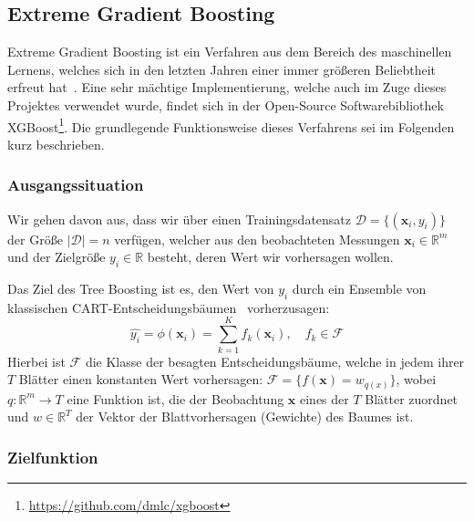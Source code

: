 \subsection{Extreme Gradient Boosting}
\label{sec:xgboost}

Extreme Gradient Boosting ist ein Verfahren aus dem Bereich des maschinellen Lernens, welches sich
in den letzten Jahren einer immer gr\"o{\ss}eren Beliebtheit erfreut hat~\cite{XGBoost}.
Eine sehr m\"achtige Implementierung, welche auch im Zuge dieses Projektes verwendet wurde, 
findet sich in der Open-Source Softwarebibliothek XGBoost\footnote{\url{https://github.com/dmlc/xgboost}}.
Die grundlegende Funktionsweise dieses Verfahrens sei im Folgenden kurz beschrieben.

\subsubsection{Ausgangssituation}

Wir gehen davon aus, dass wir \"uber einen Trainingsdatensatz $\mathcal{D} = \{(\mathbf{x}_i, y_i)\}$
der Gr\"o{\ss}e $\left| \mathcal{D} \right| = n$ verf\"ugen, welcher aus den beobachteten Messungen $\mathbf{x}_i \in \mathbb{R}^m$
und der Zielgr\"o{\ss}e $y_i \in \mathbb{R}$ besteht, deren Wert wir vorhersagen wollen.

Das Ziel des Tree Boosting ist es, den Wert von $y_i$ durch ein Ensemble von klassischen CART-Entscheidungsb\"aumen~\cite{CART}
vorherzusagen:
\begin{equation}
    \hat{y_i} = \phi(\mathbf{x}_i) =  \sum_{k=1}^K f_k(\mathbf{x}_i), \quad f_k \in \mathcal{F}
\end{equation}
Hierbei ist $\mathcal{F}$ die Klasse der besagten Entscheidungsb\"aume, welche in jedem ihrer $T$ Bl\"atter
einen konstanten Wert vorhersagen: $\mathcal{F} = \{f(\mathbf{x}) = w_{q(x)}\}$, wobei $q: \mathbb{R}^m \rightarrow T$
eine Funktion ist, die der Beobachtung $\mathbf{x}$ eines der $T$ Bl\"atter zuordnet und $w \in \mathbb{R}^T$ der Vektor
der Blattvorhersagen (Gewichte) des Baumes ist.

\subsubsection{Zielfunktion}

